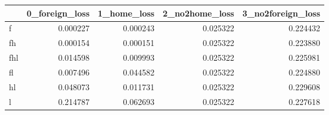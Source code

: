 \begin{tabular}{lrrrr}
\toprule
 & 0_foreign_loss & 1_home_loss & 2_no2home_loss & 3_no2foreign_loss \\
\midrule
f & 0.000227 & 0.000243 & 0.025322 & 0.224432 \\
fh & 0.000154 & 0.000151 & 0.025322 & 0.223880 \\
fhl & 0.014598 & 0.009993 & 0.025322 & 0.225981 \\
fl & 0.007496 & 0.044582 & 0.025322 & 0.224880 \\
hl & 0.048073 & 0.011731 & 0.025322 & 0.229608 \\
l & 0.214787 & 0.062693 & 0.025322 & 0.227618 \\
\bottomrule
\end{tabular}
